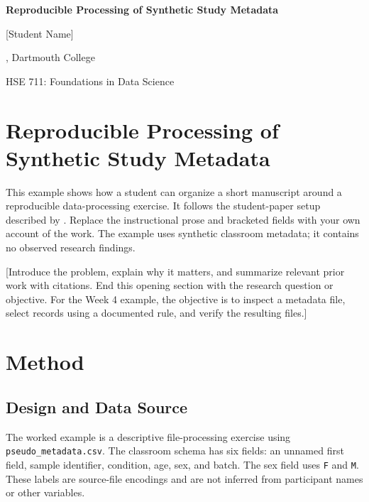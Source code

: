 \documentclass[12pt,letterpaper]{article}
\newcommand{\papertitle}{Reproducible Processing of Synthetic Study Metadata}
\newcommand{\studentname}{[Student Name]}
\newcommand{\affiliation}{[Department or Program], Dartmouth College}
\newcommand{\coursename}{HSE 711: Foundations in Data Science}
\newcommand{\instructorname}{[Instructor Name]}
\newcommand{\duedate}{[Month Day, Year]}
\newif\ifincludeabstract
\begin{document}
\begin{center}
\vspace*{2\baselineskip}
\textbf{\papertitle}\par
\vspace{\baselineskip}
\studentname\par
\affiliation\par
\coursename\par
\instructorname\par
\duedate\par
\end{center}
\newpage

\ifincludeabstract
\section*{Abstract}
\noindent [Write one unindented paragraph summarizing the purpose, design,
data, methods, principal results, and conclusion. Use the word limit assigned
by the instructor. Replace this instruction only after verifying the results.]
\par\noindent\textit{Keywords:} [term one], [term two], [term three]
\newpage
\fi

\section*{\papertitle}
This example shows how a student can organize a short manuscript around a
reproducible data-processing exercise. It follows the student-paper setup
described by \citet{apa-paper}. Replace the instructional prose and bracketed
fields with your own account of the work. The example uses synthetic classroom
metadata; it contains no observed research findings.

[Introduce the problem, explain why it matters, and summarize relevant prior
work with citations. End this opening section with the research question or
objective. For the Week 4 example, the objective is to inspect a metadata file,
select records using a documented rule, and verify the resulting files.]

\section{Method}
\subsection{Design and Data Source}
The worked example is a descriptive file-processing exercise using
\texttt{pseudo\_metadata.csv}. The classroom schema has six fields: an unnamed
first field, sample identifier, condition, age, sex, and batch. The sex field
uses \texttt{F} and \texttt{M}. These labels are source-file encodings and are
not inferred from participant names or other variables.
\end{document}
